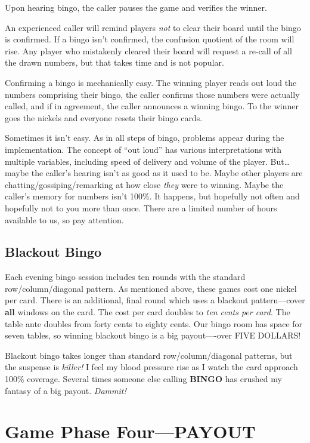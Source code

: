 \documentclass[
  letterpaper,
  DIV=11,
  numbers=noendperiod]{scrreprt}
\begin{document}
Upon hearing bingo, the caller pauses the game and verifies the winner.

An experienced caller will remind players \emph{not} to clear their
board until the bingo is confirmed. If a bingo isn't confirmed, the
confusion quotient of the room will rise. Any player who mistakenly
cleared their board will request a re-call of all the drawn numbers, but
that takes time and is not popular.

Confirming a bingo is mechanically easy. The winning player reads out
loud the numbers comprising their bingo, the caller confirms those
numbers were actually called, and if in agreement, the caller announces
a winning bingo. To the winner goes the nickels and everyone resets
their bingo cards.

Sometimes it isn't easy. As in all steps of bingo, problems appear
during the implementation. The concept of ``out loud'' has various
interpretations with multiple variables, including speed of delivery and
volume of the player. But\ldots maybe the caller's hearing isn't as good
as it used to be. Maybe other players are chatting/gossiping/remarking
at how close \emph{they} were to winning. Maybe the caller's memory for
numbers isn't 100\%. It happens, but hopefully not often and hopefully
not to you more than once. There are a limited number of hours available
to us, so pay attention.

\subsection*{Blackout Bingo}\label{blackout-bingo}

Each evening bingo session includes ten rounds with the standard
row/column/diagonal pattern. As mentioned above, these games cost one
nickel per card. There is an additional, final round which uses a
blackout pattern---cover \textbf{all} windows on the card. The cost per
card doubles to \emph{ten cents per card}. The table ante doubles from
forty cents to eighty cents. Our bingo room has space for seven tables,
so winning blackout bingo is a big payout----over FIVE DOLLARS!

Blackout bingo takes longer than standard row/column/diagonal patterns,
but the suspense is \emph{killer!} I feel my blood pressure rise as I
watch the card approach 100\% coverage. Several times someone else
calling \textbf{BINGO} has crushed my fantasy of a big payout.
\emph{Dammit!}

\section*{Game Phase Four---PAYOUT}\label{game-phase-fourpayout}
\end{document}

